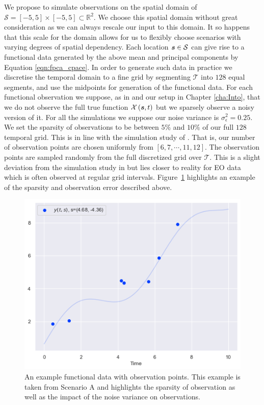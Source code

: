 We propose to simulate observations on the spatial domain of $\mathcal{S} = \left[-5, 5\right] \times \left[-5, 5\right] \subset \mathbb{R}^2$.
We choose this spatial domain without great consideration as we can always rescale our input to this domain.
It so happens that this scale for the domain allows for us to flexibly choose scenarios with varying degrees of spatial dependency.
Each location $\bm{{s}} \in \mathcal{S}$ can give rise to a functional data generated by the above mean and principal components by Equation \eqref{eqn:fpca_cpace}.
In order to generate such data in practice we discretise the temporal domain to a fine grid by segmenting $\mathcal{T}$ into $128$ equal segments, and use the midpoints for generation of the functional data.
For each functional observation we suppose, as in \citep{yao_functional_2005} and our setup in Chapter \ref{cha:Into}, that we do not observe the full true function $\mathcal{X}\left(\bm{{s}}, t\right)$ but we sparsely observe a noisy version of it.
For all the simulations we suppose our noise variance is $\sigma^2_\epsilon = 0.25$. 
We set the sparsity of observations to be between $5\%$ and $10\%$ of our full $128$ temporal grid.
This is in line with the simulation study of \citeauthor{yao_functional_2005}.
That is, our number of observation points are chosen uniformly from $\left[6, 7, \cdots, 11, 12\right]$.
The observation points are sampled randomly from the full discretized grid over $\mathcal{T}$.
This is a slight deviation from the simulation study in \citep{yao_functional_2005} but lies closer to reality for EO data which is often observed at regular grid intervals.
Figure~\ref{fig:sim_example} highlights an example of the sparsity and observation error described above.

\begin{figure}
	\centering
	\includegraphics[width=\textwidth]{sim_ex}
	\caption[An example simulated functional data from Scenario A.]{An example functional data with observation points. This example is taken from Scenario A and highlights the sparsity of observation as well as the impact of the noise variance on observations.}
	\label{fig:sim_example}
\end{figure}

